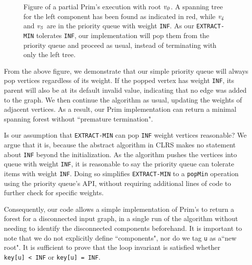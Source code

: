 \begin{figure}[H]
\caption{Figure of a partial Prim's execution with root $\mathit{v_0}$. A spanning tree for the left component has been found as indicated in red, while $\mathit{v_4}$ and $\mathit{v_5}$ are in the priority queue with weight \texttt{INF}. As our \texttt{EXTRACT-MIN} tolerates \texttt{INF}, our implementation will pop them from the priority queue and proceed as usual, instead of terminating with only the left tree.}
\end{figure}

From the above figure, we demonstrate that our simple priority queue will always pop vertices regardless of its weight. If the popped vertex has weight \texttt{INF}, its parent will also be at its default invalid value, indicating that no edge was added to the graph. We then continue the algorithm as usual, updating the weights of adjacent vertices. As a result, our Prim implementation can return a minimal spanning forest without ``premature termination".

Is our assumption that \texttt{EXTRACT-MIN} can pop \texttt{INF} weight vertices reasonable? We argue that it is, because the abstract algorithm in CLRS makes no statement about \texttt{INF} beyond the initialization. As the algorithm pushes the vertices into queue with weight \texttt{INF}, it is reasonable to say the priority queue can tolerate items with weight \texttt{INF}. Doing so simplifies \texttt{EXTRACT-MIN} to a \texttt{popMin} operation using the priority queue's API, without requiring additional lines of code to further check for specific weights.

Consequently, our code allows a simple implementation of Prim's to return a forest for a disconnected input graph, in a single run of the algorithm without needing to identify the disconnected components beforehand. It is important to note that we do not explicitly define ``components", nor do we tag \texttt{u} as a``new root". It is sufficient to prove that the loop invariant is satisfied whether \texttt{key[u]~< INF} or \texttt{key[u] = INF}.

